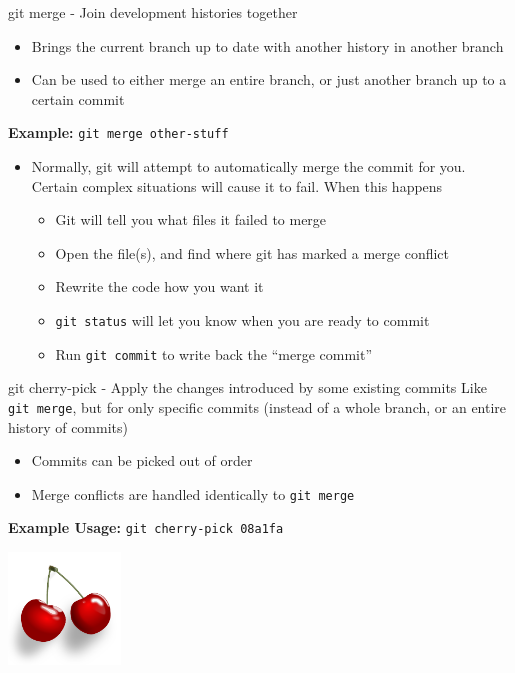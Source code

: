 \documentclass[aspectratio=43]{beamer}
\begin{document}
\begin{frame}{git merge - Join development histories together}
    \begin{itemize}
    \item Brings the current branch up to date with another history in another
        branch
    \item Can be used to either merge an entire branch, or just another branch
        up to a certain commit
    \end{itemize}
    \textbf{Example:} \texttt{git merge other-stuff}
    \begin{itemize}
    \item Normally, git will attempt to automatically merge the commit for you.
        Certain complex situations will cause it to fail. When this happens
        \begin{itemize}
        \item Git will tell you what files it failed to merge
        \item Open the file(s), and find where git has marked a merge conflict
        \item Rewrite the code how you want it
        \item \texttt{git status} will let you know when you are ready to commit
        \item Run \texttt{git commit} to write back the ``merge commit''
        \end{itemize}
    \end{itemize}
\end{frame}

\begin{frame}{git cherry-pick - Apply the changes introduced by some existing
              commits}
    Like \texttt{git merge}, but for only specific commits (instead of a whole
    branch, or an entire history of commits)

    \begin{itemize}
    \item Commits can be picked out of order
    \item Merge conflicts are handled identically to \texttt{git merge}
    \end{itemize}

    \textbf{Example Usage:} \texttt{git cherry-pick 08a1fa}
    \begin{flushright}
        \includegraphics[height=3cm]{resources/cherries.pdf}
    \end{flushright}
\end{frame}
\end{document}
